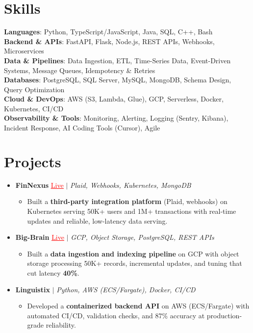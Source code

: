 \documentclass[letterpaper,10pt]{article}
\newcommand{\resumeItem}[1]{\item\small{{#1 \vspace{-2pt}}}}
\newcommand{\resumeProjectHeading}[1]{\item \small #1 \vspace{-2pt}}
\newcommand{\resumeSubHeadingListStart}{\begin{itemize}[leftmargin=0.0in, label={}]}
\newcommand{\resumeSubHeadingListEnd}{\end{itemize}}
\newcommand{\resumeProjItemListStart}{\begin{itemize}[leftmargin=0.15in,label=\textbullet,itemsep=0pt,topsep=0pt,parsep=0pt,partopsep=0pt]}
\newcommand{\resumeProjItemListEnd}{\end{itemize}\vspace{-4pt}}
\begin{document}
\section{Skills}
\begin{itemize}[leftmargin=0.15in, label={}]
\small{\item{
\textbf{Languages}: Python, TypeScript/JavaScript, Java, SQL, C++, Bash \\
\textbf{Backend \& APIs}: FastAPI, Flask, Node.js, REST APIs, Webhooks, Microservices \\
\textbf{Data \& Pipelines}: Data Ingestion, ETL, Time-Series Data, Event-Driven Systems, Message Queues, Idempotency \& Retries \\
\textbf{Databases}: PostgreSQL, SQL Server, MySQL, MongoDB, Schema Design, Query Optimization \\
\textbf{Cloud \& DevOps}: AWS (S3, Lambda, Glue), GCP, Serverless, Docker, Kubernetes, CI/CD \\
\textbf{Observability \& Tools}: Monitoring, Alerting, Logging (Sentry, Kibana), Incident Response, AI Coding Tools (Cursor), Agile
}}
\end{itemize}
\vspace{-6pt}
\section{Projects}
\resumeSubHeadingListStart
\vspace{-2pt}
\resumeProjectHeading{\textbf{FinNexus} {\href{https://fin-nexus.vercel.app/}{\textcolor{red}{\underline{Live}}}} $|$ \emph{Plaid, Webhooks, Kubernetes, MongoDB}}
\resumeProjItemListStart
\resumeItem{Built a \textbf{third-party integration platform} (Plaid, webhooks) on Kubernetes serving 50K+ users and 1M+ transactions with real-time updates and reliable, low-latency data serving.}
\resumeProjItemListEnd
\vspace{3pt}
\resumeProjectHeading{\textbf{Big-Brain} {\href{https://big-brain-pied.vercel.app/}{\textcolor{red}{\underline{Live}}}} $|$ \emph{GCP, Object Storage, PostgreSQL, REST APIs}}
\resumeProjItemListStart
\resumeItem{Built a \textbf{data ingestion and indexing pipeline} on GCP with object storage processing 50K+ records, incremental updates, and tuning that cut latency \textbf{40\%}.}
\resumeProjItemListEnd
\vspace{3pt}
\resumeProjectHeading{\textbf{Linguistix} $|$ \emph{Python, AWS (ECS/Fargate), Docker, CI/CD}}
\resumeProjItemListStart
\resumeItem{Developed a \textbf{containerized backend API} on AWS (ECS/Fargate) with automated CI/CD, validation checks, and 87\% accuracy at production-grade reliability.}
\resumeProjItemListEnd
\resumeSubHeadingListEnd
\end{document}
